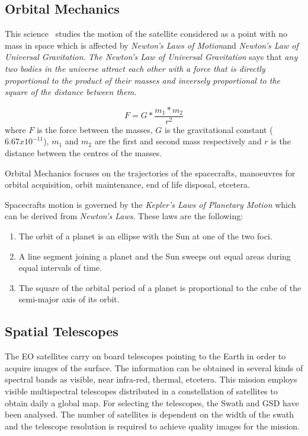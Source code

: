 \subsection{Orbital Mechanics}

This science~\cite{http://en.wikipedia.org/wiki/Orbital_mechanics} studies the motion of the satellite considered as a point with no
mass in space which is affected by \emph{Newton's Laws of Motion}and \emph{Newton's Law of
Universal Gravitation}.
\emph{The Newton's Law of Universal Gravitation} says that \emph{any two bodies in the
universe attract each other with a force that is directly proportional to the
product of their masses and inversely proportional to the square of the distance
between them.}

\begin{equation}
F = G* {\frac {m_1*m_2}{r^2}}
\end{equation}
where $F$ is the force between the masses, $G$ is the gravitational constant
($6.67x10^{-11}$), $m_1$ and $m_2$ are the first and second mass respectively
and $r$ is the distance between the centres of the masses.

Orbital Mechanics focuses on the trajectories of the
spacecrafts, manoeuvres for orbital acquisition, orbit maintenance, end of life
disposal, etcetera.

Spacecrafts motion  is governed by the \emph{Kepler's Laws of Planetary Motion}
which can be derived from \emph{Newton's Laws}. These laws are the following:
\begin{enumerate}
\item The orbit of a planet is an ellipse with the Sun at one of the two foci.
\item A line segment joining a planet and the Sun sweeps out equal areas during
  equal intervals of time.
\item The square of the orbital period of a planet is proportional to the cube
  of the semi-major axis of its orbit.
\end{enumerate}


\subsection{Spatial Telescopes }

The \ac{EO} satellites carry on board telescopes pointing to the Earth in order
to acquire images of the surface. The information can be obtained in several
kinds of spectral bands as visible, near infra-red, thermal, etcetera. This
mission employs visible multispectral telescopes distributed in a constellation of satellites
to obtain daily a global map. For selecting the telescopes, the Swath and \ac{GSD}
have been analysed. The number of satellites is dependent on the width of the
swath and the telescope resolution is required to achieve quality
images for the mission.

